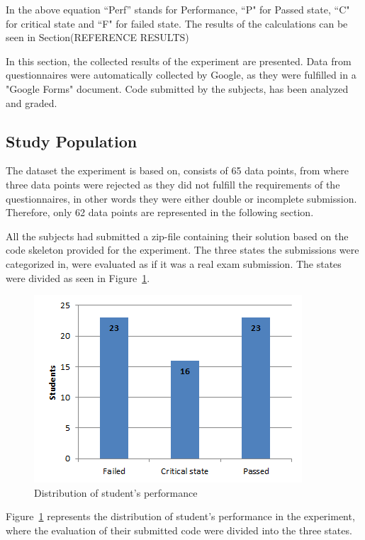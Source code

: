 \documentclass{sig-alternate-05-2015}
\begin{document}
In the above equation ``Perf'' stands for Performance, ``P" for Passed state, ``C" for critical state and ``F" for failed state. 
The results of the calculations can be seen in Section(REFERENCE RESULTS)

\label{sec:Results}
In this section, the collected results of the experiment are presented. Data from questionnaires were automatically collected by Google, as they were fulfilled in a "Google Forms" document. Code submitted by the subjects, has been analyzed and graded.

\subsection{Study Population}
\label{DemograpichInformation}
The dataset the experiment is based on, consists of 65 data points, from where three data points were rejected as they did not fulfill the requirements of the questionnaires, in other words they were either double or incomplete submission. Therefore, only 62 data points are represented in the following section.

All the subjects had submitted a zip-file containing their solution based on the code skeleton provided for the experiment. The three states the submissions were categorized in, were evaluated as if it was a real exam submission.
The states were divided as seen in Figure~\ref{fig:DistributionOfStudentPerformance}.

\begin{figure}[!ht]
	\centering
	\includegraphics[width=1\linewidth]{img01}
	\caption{Distribution of student's performance}
	\label{fig:DistributionOfStudentPerformance}
\end{figure}
Figure~\ref{fig:DistributionOfStudentPerformance} represents the distribution of student's performance in the experiment, where the evaluation of their submitted code were divided into the three states.\\
\end{document}
